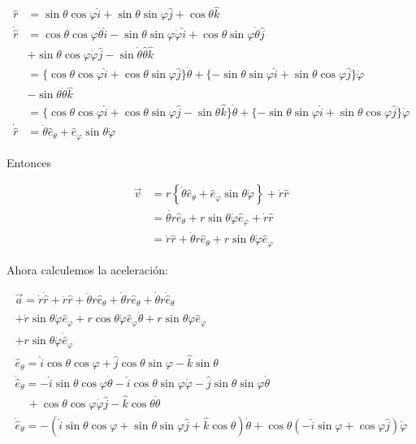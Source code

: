 $$
\begin{aligned}
\widehat{r} & =\sin \theta \cos \varphi \hat{i}+\sin \theta \sin \varphi \hat{j}+\cos \theta \hat{k} \\
\dot{\hat{r}} & =\cos \theta \cos \varphi \dot{\theta} \hat{i}-\sin \theta \sin \varphi \dot{\varphi} \hat{i}+\cos \theta \sin \varphi \dot{\theta} \hat{j} \\
& +\sin \theta \cos \varphi \dot{\varphi} \hat{j}-\sin \dot{\theta} \hat{\theta} \hat{k} \\
& =\{\cos \theta \cos \varphi \hat{i}+\cos \theta \sin \varphi \hat{j}\} \dot{\theta}+\{-\sin \theta \sin \varphi \hat{i}+\sin \theta \cos \varphi \hat{j}\} \dot{\varphi} \\
& -\sin \theta \dot{\theta} \hat{k} \\
& =\{\cos \theta \cos \varphi \hat{i}+\cos \theta \sin \varphi \hat{j}-\sin \theta \hat{k}\} \dot{\theta}+\{-\sin \theta \sin \varphi \hat{i}+\sin \theta \cos \varphi \hat{j}\} \dot{\varphi} \\
\dot{\hat{r}} & =\dot{\theta} \widehat{e}_{\theta}+\widehat{e}_{\varphi} \sin \theta \dot{\varphi}
\end{aligned}
$$

Entonces

$$
\begin{aligned}
\vec{v} & =r\left\{\dot{\theta} \widehat{e}_{\theta}+\widehat{e}_{\varphi} \sin \theta \dot{\varphi}\right\}+\dot{r} \widehat{r} \\
& =\dot{\theta r} \widehat{e}_{\theta}+r \sin \theta \dot{\varphi} \widehat{e}_{\varphi}+\dot{r} \widehat{r} \\
& =\dot{r} \hat{r}+\dot{\theta} r \widehat{e}_{\theta}+r \sin \theta \dot{\varphi} \widehat{e}_{\varphi}
\end{aligned}
$$

Ahora calculemos la aceleración:

$$
\begin{gathered}
\vec{a}=\dot{r} \dot{\hat{r}}+\ddot{r} \hat{r}+\ddot{\theta} r \widehat{e}_{\theta}+\dot{\theta} \dot{r} \hat{e}_{\theta}+\dot{\theta} r \dot{\hat{e}}_{\theta} \\
+\dot{r} \sin \theta \dot{\varphi} \widehat{e}_{\varphi}+r \cos \theta \dot{\varphi} \hat{e}_{\varphi} \dot{\theta}+r \sin \theta \ddot{\varphi} \widehat{e}_{\varphi} \\
+r \sin \theta \dot{\varphi} \dot{\hat{e}}_{\varphi} \\
\widehat{e}_{\theta}=\hat{i} \cos \theta \cos \varphi+\hat{j} \cos \theta \sin \varphi-\hat{k} \sin \theta \\
\dot{\hat{e}}_{\theta}=-\hat{i} \sin \theta \cos \varphi \dot{\theta}-\hat{i} \cos \theta \sin \varphi \dot{\varphi}-\hat{j} \sin \theta \sin \varphi \dot{\theta} \\
\quad+\cos \theta \cos \varphi \dot{\varphi} \hat{j}-\hat{k} \cos \theta \dot{\theta} \\
\dot{\hat{e}}_{\theta}=-(\hat{i} \sin \theta \cos \varphi+\sin \theta \sin \varphi \hat{j}+\hat{k} \cos \theta) \dot{\theta}+\cos \theta(-\hat{i} \sin \varphi+\cos \varphi \hat{j}) \dot{\varphi}
\end{gathered}
$$

